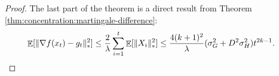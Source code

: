 \begin{proof}
The last part of the theorem is a direct result from Theorem \ref{thm:concentration:martingale-difference}:
\begin{align*}
    \mathop{\mathbb{E}}[ \| \nabla f(x_t)-g_t \|_*^2]
    \leq \frac{2}{\lambda} \sum_{i=1}^t \mathop{\mathbb{E}}[\|X_i\|_*^2] 
    &\leq \frac{4(k+1)^2}{\lambda}(\sigma_G^2+D^2\sigma_H^2)t^{2k-1}.
\end{align*}
\end{proof}

